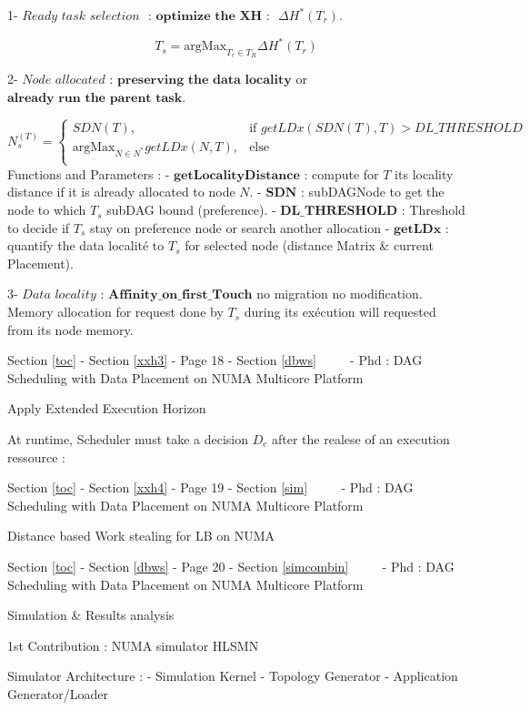 \documentclass[11pt]{article}
\begin{document}
1- \(\textit{Ready task selection }\) : \(\textbf{optimize the XH : }\)
\(\Delta H^*(T_r)\).

\[
T_s =  \text{argMax}_{T_r \in T_R} \Delta H^*(T_r) 
\]

 2- \(\textit{Node allocated}\) :
\(\textbf{preserving the data locality}\) or
\(\textbf{already run the parent task}\).

\[
N_s^(T) =
\begin{cases}
SDN(T), & \text{if } getLDx(SDN(T),T) > DL\_THRESHOLD\\
\text{argMax}_{N \in N^*} getLDx(N, T), & \text{else}\\
\end{cases}
\] Functions and Parameters : - \(\textbf{getLocalityDistance}\) :
compute for \(T\) its locality distance if it is already allocated to
node \(N\). - \(\textbf{SDN}\) : subDAGNode to get the node to which
\(T_s\) subDAG bound (preference). - \(\textbf{DL_THRESHOLD}\) :
Threshold to decide if \(T_s\) stay on preference node or search another
allocation - \(\textbf{getLDx}\) : quantify the data localité to \(T_s\)
for selected node (distance Matrix \& current Placement).

 3- \(\textit{Data locality}\) : \(\textbf{Affinity_on_first_Touch}\) no
migration no modification. Memory allocation for request done by \(T_s\)
during its exécution will requested from its node memory.

     {Section \ref{toc} - Section \ref{xxh3} - Page 18 - Section \ref{dbws}
~~~~ - Phd : DAG Scheduling with Data Placement on NUMA Multicore
Platform}

Apply Extended Execution Horizon

At runtime, Scheduler must take a decision \(D_c\) after the realese of
an execution ressource :

     {Section \ref{toc} - Section \ref{xxh4} - Page 19 - Section \ref{sim}
~~~~ - Phd : DAG Scheduling with Data Placement on NUMA Multicore
Platform}

Distance based Work stealing for LB on NUMA

 

     {Section \ref{toc} - Section \ref{dbws} - Page 20 -
Section \ref{simcombin} ~~~~ - Phd : DAG Scheduling with Data Placement
on NUMA Multicore Platform}

Simulation \& Results analysis

1st Contribution : NUMA simulator HLSMN

Simulator Architecture : - Simulation Kernel - Topology Generator -
Application Generator/Loader
\end{document}
